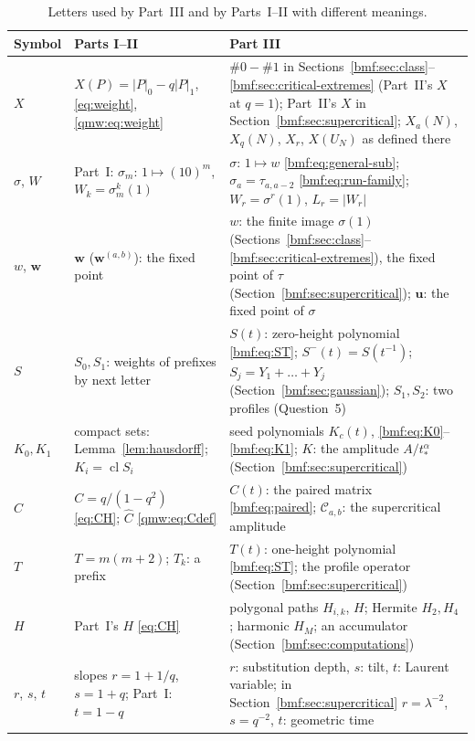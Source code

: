 \documentclass[11pt]{article}
\numberwithin{equation}{section}
\theoremstyle{definition}
\theoremstyle{remark}
\newcommand{\cl}{\operatorname{cl}}
\newcommand{\word}{\mathbf{w}}
\newcommand{\abs}[1]{\lvert#1\rvert}
\newcommand{\ones}[1]{\lvert#1\rvert_1}
\newcommand{\zeros}[1]{\lvert#1\rvert_0}
\begin{document}
\begin{table}[htbp]
\centering\small
\caption{Letters used by Part~III and by Parts~I--II with different
meanings.}\label{bmf:tab:notation}
\begin{tabular}{>{\raggedright\arraybackslash}p{}>{\raggedright\arraybackslash}p{}>{\raggedright\arraybackslash}p{}}
\toprule
Symbol & Parts I--II & Part III\\
\midrule
$X$ & $X(P)=\zeros P-q\ones P$, \eqref{eq:weight}, \eqref{qmw:eq:weight} & $\#0-\#1$ in Sections~\ref{bmf:sec:class}--\ref{bmf:sec:critical-extremes} (Part~II's $X$ at $q=1$); Part~II's $X$ in Section~\ref{bmf:sec:supercritical}; $X_a(N)$, $X_q(N)$, $X_r$, $X(U_N)$ as defined there\\
$\sigma$, $W$ & Part~I: $\sigma_m$: $1\mapsto(10)^m$, $W_k=\sigma_m^k(1)$ & $\sigma$: $1\mapsto w$ \eqref{bmf:eq:general-sub}; $\sigma_a=\tau_{a,a-2}$ \eqref{bmf:eq:run-family}; $W_r=\sigma^r(1)$, $L_r=\abs{W_r}$\\
$w$, $\word$ & $\word$ ($\word^{(a,b)}$): the fixed point & $w$: the finite image $\sigma(1)$ (Sections~\ref{bmf:sec:class}--\ref{bmf:sec:critical-extremes}), the fixed point of $\tau$ (Section~\ref{bmf:sec:supercritical}); $\mathbf u$: the fixed point of $\sigma$\\
$S$ & $S_0,S_1$: weights of prefixes by next letter & $S(t)$: zero-height polynomial \eqref{bmf:eq:ST}; $S^-(t)=S(t^{-1})$; $S_j=Y_1+\dots+Y_j$ (Section~\ref{bmf:sec:gaussian}); $S_1,S_2$: two profiles (Question~5)\\
$K_0,K_1$ & compact sets: Lemma~\ref{lem:hausdorff}; $K_i=\cl S_i$ & seed polynomials $K_c(t)$, \eqref{bmf:eq:K0}--\eqref{bmf:eq:K1}; $K$: the amplitude $A/t_*^\alpha$ (Section~\ref{bmf:sec:supercritical})\\
$C$ & $C=q/(1-q^2)$ \eqref{eq:CH}; $\widehat C$ \eqref{qmw:eq:Cdef} & $C(t)$: the paired matrix \eqref{bmf:eq:paired}; $\mathcal C_{a,b}$: the supercritical amplitude\\
$T$ & $T=m(m+2)$; $T_k$: a prefix & $T(t)$: one-height polynomial \eqref{bmf:eq:ST}; the profile operator (Section~\ref{bmf:sec:supercritical})\\
$H$ & Part~I's $H$ \eqref{eq:CH} & polygonal paths $H_{i,k}$, $H$; Hermite $H_2,H_4$; harmonic $H_M$; an accumulator (Section~\ref{bmf:sec:computations})\\
$r$, $s$, $t$ & slopes $r=1+1/q$, $s=1+q$; Part~I: $t=1-q$ & $r$: substitution depth, $s$: tilt, $t$: Laurent variable; in Section~\ref{bmf:sec:supercritical} $r=\lambda^{-2}$, $s=q^{-2}$, $t$: geometric time\\

\end{tabular}
\end{table}
\end{document}

